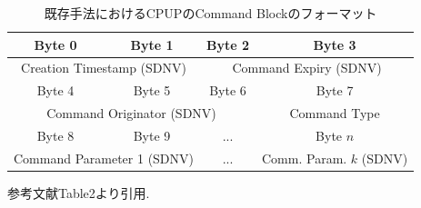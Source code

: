 \begin{table}[htbp]
    \centering
    \caption{既存手法におけるCPUPのCommand Blockのフォーマット}
    \label{table:command_block_format}
    \begin{tabular}{|c|c|c|c|}
      \hline
      Byte 0 & Byte 1 & Byte 2 & Byte 3 \\
      \hline
      \multicolumn{2}{|c|}{Creation Timestamp (SDNV)} & \multicolumn{2}{c|}{Command Expiry (SDNV)} \\
      \hline
      Byte 4 & Byte 5 & Byte 6 & Byte 7 \\
      \hline
      \multicolumn{3}{|c|}{Command Originator (SDNV)} & Command Type \\
      \hline
      Byte 8 & Byte 9 & ... & Byte $n$ \\
      \hline
      \multicolumn{2}{|c|}{Command Parameter 1 (SDNV)} & \multicolumn{1}{c|}{...} & Comm. Param. $k$ (SDNV) \\
      \hline
    \end{tabular}
    \begin{minipage}{\textwidth}
        \centering
        \vspace{3mm}
        参考文献\cite{Bezirgiannidis2013}Table2より引用.  
    \end{minipage}
  \end{table}
  